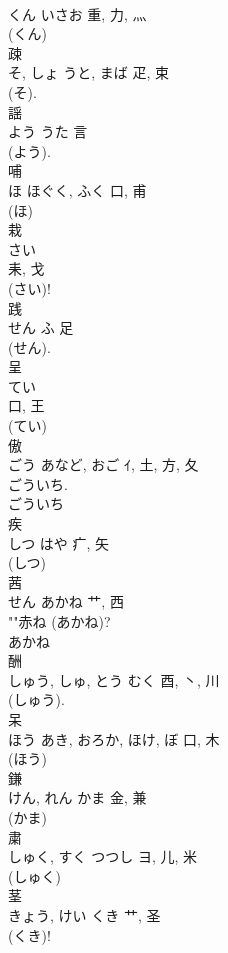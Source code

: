 \documentclass[8pt]{extreport}
\begin{document}
\begin{CJK}{UTF8}{min}
\\	くん	いさお	重, 力, 灬	
\\	(くん) 
\\	疎	
\\	そ, しょ	うと, まば	疋, 束	
\\	(そ). 
\\	謡	
\\	よう	うた	言		
\\	(よう). 
\\	哺	
\\	ほ	ほぐく, ふく	口, 甫	
\\	(ほ) 
\\	栽	
\\	さい	
\\	耒, 戈	
\\	(さい)!	
\\	践	
\\	せん	ふ	足		
\\	(せん). 
\\	呈	
\\	てい	
\\	口, 王	
\\	(てい) 
\\	傲	
\\	ごう	あなど, おご	ｲ, 土, 方, 夂	
\\	ごういち. 
\\	ごういち 
\\	疾	
\\	しつ	はや	疒, 矢	
\\	(しつ) 
\\	茜	
\\	せん	あかね	艹, 西	
\\	""赤ね (あかね)?
\\	あかね 
\\	酬	
\\	しゅう, しゅ, とう	むく	酉, 丶, 川	
\\	(しゅう). 
\\	呆	
\\	ほう	あき, おろか, ほけ, ぼ	口, 木	
\\	(ほう) 
\\	鎌	
\\	けん, れん	かま	金, 兼	
\\	(かま) 
\\	粛	
\\	しゅく, すく	つつし	ヨ, 儿, 米		
\\	(しゅく) 
\\	茎	
\\	きょう, けい	くき	艹, 圣	
\\	(くき)! 

\end{CJK}
\end{document}
